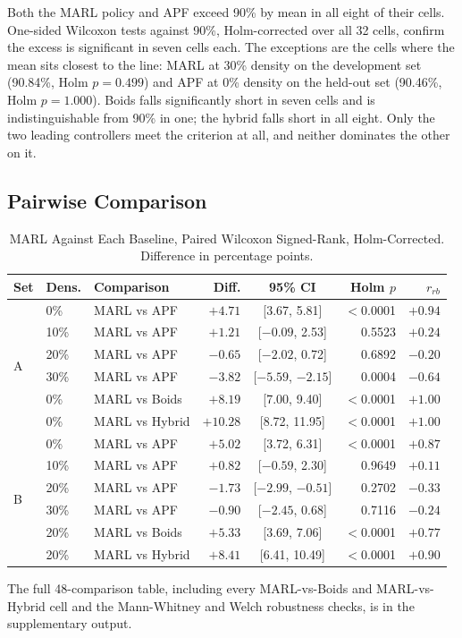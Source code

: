 \documentclass[a4paper, 10pt, conference]{ieeeconf}
\begin{document}
Both the MARL policy and APF exceed 90\% by mean in all eight of their
cells. One-sided Wilcoxon tests against 90\%, Holm-corrected over all
32 cells, confirm the excess is significant in seven cells each. The
exceptions are the cells where the mean sits closest to the line: MARL
at 30\% density on the development set (90.84\%, Holm $p = 0.499$) and
APF at 0\% density on the held-out set (90.46\%, Holm $p = 1.000$).
Boids falls significantly short in seven cells and is
indistinguishable from 90\% in one; the hybrid falls short in all
eight. Only the two leading controllers meet the criterion at all, and
neither dominates the other on it.

\subsection{Pairwise Comparison}\label{sec:pairwise}

\begin{table}[htb]
\centering
\caption{MARL Against Each Baseline, Paired Wilcoxon Signed-Rank,
Holm-Corrected. Difference in percentage points.}
\label{tab:stats}
\scriptsize
\setlength{\tabcolsep}{1.6pt}
\begin{tabular}{lllrcrr}
\toprule
\textbf{Set} & \textbf{Dens.} & \textbf{Comparison} & \textbf{Diff.} &
\textbf{95\% CI} & \textbf{Holm $p$} & \textbf{$r_{rb}$} \\
\midrule
\multirow{6}{*}{A}
& 0\%  & MARL vs APF    & $+4.71$  & [3.67, 5.81]        & $<$0.0001 & $+0.94$ \\
& 10\% & MARL vs APF    & $+1.21$  & [$-0.09$, 2.53]     & 0.5523    & $+0.24$ \\
& 20\% & MARL vs APF    & $-0.65$  & [$-2.02$, 0.72]     & 0.6892    & $-0.20$ \\
& 30\% & MARL vs APF    & $-3.82$  & [$-5.59$, $-2.15$]  & 0.0004    & $-0.64$ \\
& 0\%  & MARL vs Boids  & $+8.19$  & [7.00, 9.40]        & $<$0.0001 & $+1.00$ \\
& 0\%  & MARL vs Hybrid & $+10.28$ & [8.72, 11.95]       & $<$0.0001 & $+1.00$ \\
\midrule
\multirow{6}{*}{B}
& 0\%  & MARL vs APF    & $+5.02$  & [3.72, 6.31]        & $<$0.0001 & $+0.87$ \\
& 10\% & MARL vs APF    & $+0.82$  & [$-0.59$, 2.30]     & 0.9649    & $+0.11$ \\
& 20\% & MARL vs APF    & $-1.73$  & [$-2.99$, $-0.51$]  & 0.2702    & $-0.33$ \\
& 30\% & MARL vs APF    & $-0.90$  & [$-2.45$, 0.68]     & 0.7116    & $-0.24$ \\
& 20\% & MARL vs Boids  & $+5.33$  & [3.69, 7.06]        & $<$0.0001 & $+0.77$ \\
& 20\% & MARL vs Hybrid & $+8.41$  & [6.41, 10.49]       & $<$0.0001 & $+0.90$ \\
\bottomrule
\end{tabular}

\vspace{0.3em}
{\footnotesize The full 48-comparison table, including every
MARL-vs-Boids and MARL-vs-Hybrid cell and the Mann-Whitney and Welch
robustness checks, is in the supplementary output.}
\end{table}
\end{document}
